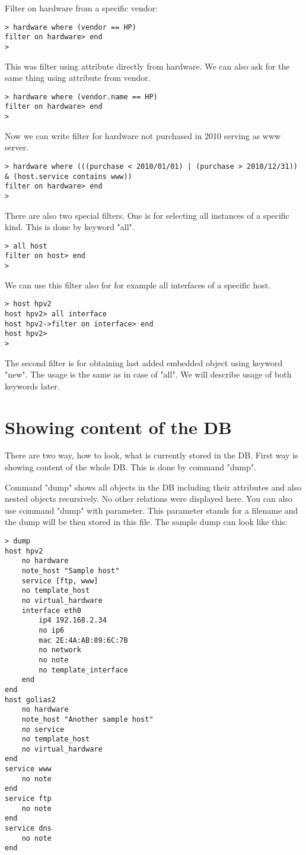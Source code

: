 \documentclass[deska]{subfiles}
\begin{document}
Filter on hardware from a specific vendor:
\begin{verbatim}
> hardware where (vendor == HP)
filter on hardware> end
>
\end{verbatim}

This was filter using attribute directly from hardware. We can also ask for the same thing using attribute from vendor.
\begin{verbatim}
> hardware where (vendor.name == HP)
filter on hardware> end
>
\end{verbatim}

Now we can write filter for hardware not purchased in 2010 serving as www server.

\begin{verbatim}
> hardware where (((purchase < 2010/01/01) | (purchase > 2010/12/31)) & (host.service contains www))
filter on hardware> end
>
\end{verbatim}

There are also two special filters. One is for selecting all instances of a specific kind. This is done by keyword "all".
\begin{verbatim}
> all host
filter on host> end
>
\end{verbatim}

We can use this filter also for for example all interfaces of a specific host.
\begin{verbatim}
> host hpv2
host hpv2> all interface
host hpv2->filter on interface> end
host hpv2>
>
\end{verbatim}

The second filter is for obtaining last added embedded object using keyword "new". The usage is the same as in case of
"all". We will describe usage of both keywords later.

\section{Showing content of the DB}

There are two way, how to look, what is currently stored in the DB. First way is showing content of the whole DB. This
is done by command "dump".

Command "dump" shows all objects in the DB including their attributes and also nested objects recursively. No other
relations were displayed here. You can also use command "dump" with parameter. This parameter stands for a filename and
the dump will be then stored in this file. The sample dump can look like this:
\begin{verbatim}
> dump
host hpv2
    no hardware
    note_host "Sample host"
    service [ftp, www]
    no template_host
    no virtual_hardware
    interface eth0
        ip4 192.168.2.34
        no ip6
        mac 2E:4A:AB:89:6C:7B
        no network
        no note
        no template_interface
    end
end
host golias2
    no hardware
    note_host "Another sample host"
    no service
    no template_host
    no virtual_hardware
end
service www
    no note
end
service ftp
    no note
end
service dns
    no note
end
\end{verbatim}
\end{document}
